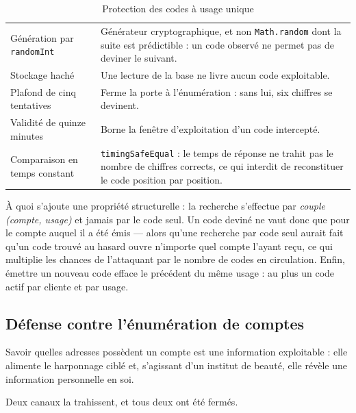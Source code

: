 \begin{table}[H]
\centering
\caption{Protection des codes à usage unique}
\label{tab:codes}
\begin{tabularx}{\textwidth}{L{4.0cm} X}
\toprule
{} &  \\
\midrule
Génération par \texttt{randomInt} &
Générateur cryptographique, et non \texttt{Math.random} dont la suite est
prédictible : un code observé ne permet pas de deviner le suivant. \\

Stockage haché &
Une lecture de la base ne livre aucun code exploitable. \\

Plafond de cinq tentatives &
Ferme la porte à l'énumération : sans lui, six chiffres se devinent. \\

Validité de quinze minutes &
Borne la fenêtre d'exploitation d'un code intercepté. \\

Comparaison en temps constant &
\texttt{timingSafeEqual} : le temps de réponse ne trahit pas le nombre de
chiffres corrects, ce qui interdit de reconstituer le code position par
position. \\
\bottomrule
\end{tabularx}
\end{table}

À quoi s'ajoute une propriété structurelle : la recherche s'effectue par
\emph{couple (compte, usage)} et jamais par le code seul. Un code deviné ne
vaut donc que pour le compte auquel il a été émis --- alors qu'une recherche
par code seul aurait fait qu'un code trouvé au hasard ouvre n'importe quel
compte l'ayant reçu, ce qui multiplie les chances de l'attaquant par le nombre
de codes en circulation. Enfin, émettre un nouveau code efface le précédent du
même usage : au plus un code actif par cliente et par usage.

\subsection{Défense contre l'énumération de comptes}

Savoir quelles adresses possèdent un compte est une information exploitable :
elle alimente le harponnage ciblé et, s'agissant d'un institut de beauté, elle
révèle une information personnelle en soi.

Deux canaux la trahissent, et tous deux ont été fermés.

